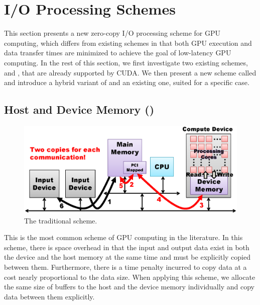 \section{I/O Processing Schemes}
\label{sec:io_processing}

This section presents a new zero-copy I/O processing scheme for GPU
computing, which differs from existing schemes in that both GPU
execution and data transfer times are minimized to achieve the goal of
low-latency GPU computing. 
In the rest of this section, we first investigate two existing schemes,
{\hd} and {\hp}, that are already supported by CUDA.
We then present a new scheme called {\dm} and introduce a hybrid
variant of {\dm} and an existing one, suited for a specific case. 

\subsection{Host and Device Memory ({\hd})}
\label{sec:hd}

\begin{figure}[!t]
 \centering
 \includegraphics[width=\hsize]{eps/hd.eps}
 \caption{The traditional {\hd} scheme.}
 \label{fig:hd}
\end{figure}

This is the most common scheme of GPU computing in the literature.
In this scheme, there is space overhead in that the input and output
data exist in both the device and the host memory at the same time and
must be explicitly copied between them.
Furthermore, there is a time penalty incurred to copy data at a cost
nearly proportional to the data size.
When applying this scheme, we allocate the same size of buffers to the
host and the device memory individually and copy data between them
explicitly.

